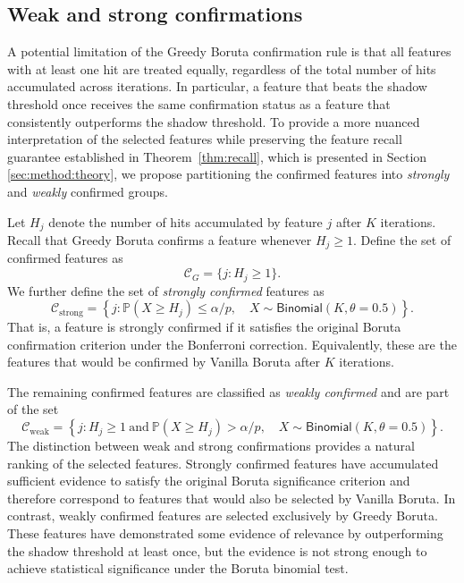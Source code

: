 \documentclass[runningheads]{llncs}
\begin{document}
\subsection{Weak and strong confirmations}

A potential limitation of the Greedy Boruta confirmation rule is that all features with at least one hit are treated equally, regardless of the total number of hits accumulated across iterations. In particular, a feature that beats the shadow threshold once receives the same confirmation status as a feature that consistently outperforms the shadow threshold. To provide a more nuanced interpretation of the selected features while preserving the feature recall guarantee established in Theorem~\ref{thm:recall}, which is presented in Section \ref{sec:method:theory}, we propose partitioning the confirmed features into \emph{strongly} and \emph{weakly} confirmed groups.

Let \(H_j\) denote the number of hits accumulated by feature \(j\) after \(K\) iterations. Recall that Greedy Boruta confirms a feature whenever \(H_j \geq 1\). Define the set of confirmed features as
\[
\mathcal{C}_G
=
\{j : H_j \geq 1\}.
\]
We further define the set of \emph{strongly confirmed} features as
\[
\mathcal{C}_{\mathrm{strong}}
=
\left\{
j :
\mathbb{P}\!\left(
X \geq H_j
\right)
\leq \alpha/p,
\quad
X \sim \mathsf{Binomial}(K,\theta = 0.5)
\right\}.
\]
That is, a feature is strongly confirmed if it satisfies the original Boruta confirmation criterion under the Bonferroni correction. Equivalently, these are the features that would be confirmed by Vanilla Boruta after \(K\) iterations. 

The remaining confirmed features are classified as \emph{weakly confirmed} and are part of the set
\[
\mathcal{C}_{\mathrm{weak}}
=
\left\{
j :
H_j \geq 1
\ \text{and}\
\mathbb{P}\!\left(
X \geq H_j
\right)
>
\alpha/p,
\quad
X \sim \mathsf{Binomial}(K,\theta = 0.5)
\right\}.
\]
The distinction between weak and strong confirmations provides a natural ranking of the selected features. Strongly confirmed features have accumulated sufficient evidence to satisfy the original Boruta significance criterion and therefore correspond to features that would also be selected by Vanilla Boruta. In contrast, weakly confirmed features are selected exclusively by Greedy Boruta. These features have demonstrated some evidence of relevance by outperforming the shadow threshold at least once, but the evidence is not strong enough to achieve statistical significance under the Boruta binomial test.
\end{document}
